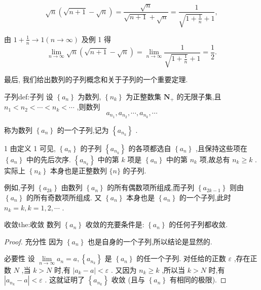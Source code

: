 \begin{solution}
\[
\sqrt{n}\left( {\sqrt{n + 1} - \sqrt{n}}\right)  = \frac{\sqrt{n}}{\sqrt{n + 1} + \sqrt{n}} = \frac{1}{\sqrt{1 + \frac{1}{n}} + 1},
\]

由 \(1 + \frac{1}{n} \rightarrow  1\left( {n \rightarrow  \infty }\right)\) 及例 1 得
\[
\mathop{\lim }\limits_{{n \rightarrow  \infty }}\sqrt{n}\left( {\sqrt{n + 1} - \sqrt{n}}\right)  = \mathop{\lim }\limits_{{n \rightarrow  \infty }}\frac{1}{\sqrt{1 + \frac{1}{n}} + 1} = \frac{1}{2}.
\]
\end{solution}



最后, 我们给出数列的子列概念和关于子列的一个重要定理.

\begin{definition}{子列}{def:子列}
设 \(\left\{  {a}_{n}\right\}\) 为数列, \(\left\{  {n}_{k}\right\}\) 为正整数集 \({\mathbf{N}}_{ + }\) 的无限子集,且 \({n}_{1} < {n}_{2} < \cdots  < {n}_{k} < \cdots\) ,则数列
\[
{a}_{{n}_{1}},{a}_{{n}_{2}},\cdots ,{a}_{{n}_{k}},\cdots
\]

称为数列 \(\left\{  {a}_{n}\right\}\) 的一个子列,记为 \(\left\{  {a}_{{n}_{k}}\right\}\) .
\end{definition}


\begin{remark}
1 由定义 1 可见, \(\left\{  {a}_{n}\right\}\) 的子列 \(\left\{  {a}_{{n}_{k}}\right\}\) 的各项都选自 \(\left\{  {a}_{n}\right\}\) ,且保持这些项在 \(\left\{  {a}_{n}\right\}\) 中的先后次序. \(\left\{  {a}_{{n}_{k}}\right\}\) 中的第 \(k\) 项是 \(\left\{  {a}_{n}\right\}\) 中的第 \({n}_{k}\) 项,故总有 \({n}_{k} \geq  k\) . 实际上 \(\left\{  {n}_{k}\right\}\) 本身也是正整数列 \(\{ n\}\) 的子列.
\end{remark}

例如,子列 \(\left\{  {a}_{2k}\right\}\) 由数列 \(\left\{  {a}_{n}\right\}\) 的所有偶数项所组成,而子列 \(\left\{  {a}_{{2k} - 1}\right\}\) 则由 \(\left\{  {a}_{n}\right\}\) 的所有奇数项所组成. 又 \(\left\{  {a}_{n}\right\}\) 本身也是 \(\left\{  {a}_{n}\right\}\) 的一个子列,此时 \({n}_{k} = k,k = 1,2,\cdots\) .

\begin{theorem}{收敛}{the:收敛}
数列 \(\left\{  {a}_{n}\right\}\) 收敛的充要条件是: \(\left\{  {a}_{n}\right\}\) 的任何子列都收敛.
\end{theorem}


\begin{proof}
充分性 因为 \(\left\{  {a}_{n}\right\}\) 也是自身的一个子列,所以结论是显然的.

必要性 设 \(\mathop{\lim }\limits_{{n \rightarrow  \infty }}{a}_{n} = a,\left\{  {a}_{{n}_{k}}\right\}\) 是 \(\left\{  {a}_{n}\right\}\) 的任一个子列. 对任给的正数 \(\varepsilon\) ,存在正数 \(N\) ,当 \(k > N\) 时,有 \(\left| {{a}_{k} - a}\right|  < \varepsilon\) . 又因为 \({n}_{k} \geq  k\) ,所以当 \(k > N\) 时,有 \(\left| {{a}_{{n}_{k}} - a}\right|  < \varepsilon\) . 这就证明了 \(\left\{  {a}_{{n}_{k}}\right\}\) 收敛 (且与 \(\left\{  {a}_{n}\right\}\) 有相同的极限).
\end{proof}


